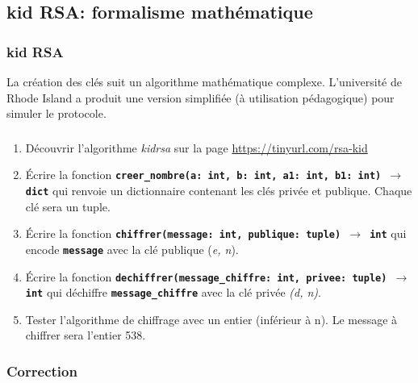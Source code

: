 \documentclass[svgnames,11pt]{beamer}
\begin{document}
\subsection{kid RSA: formalisme mathématique}
\begin{frame}
    \frametitle{kid RSA}

    La création des clés suit un algorithme mathématique complexe. L'université de Rhode Island a produit une version simplifiée (à utilisation pédagogique) pour simuler le protocole.

\end{frame}
\begin{frame}
    \frametitle{}

    \begin{activite}
        \begin{enumerate}
            \item Découvrir l'algorithme \emph{kidrsa} sur la page \url{https://tinyurl.com/rsa-kid}
            \item Écrire la fonction \textbf{\texttt{creer\_nombre(a: int, b: int, a1: int, b1: int) $\rightarrow$ dict}} qui renvoie un dictionnaire contenant les clés privée et publique. Chaque clé sera un tuple.
            \item Écrire la fonction \textbf{\texttt{chiffrer(message: int, publique: tuple) $\rightarrow$ int}} qui encode \texttt{\textbf{message}} avec la clé publique (\emph{e, n}).
            \item Écrire la fonction \textbf{\texttt{dechiffrer(message\_chiffre: int, privee: tuple) $\rightarrow$ int}} qui déchiffre \texttt{\textbf{message\_chiffre}} avec la clé privée \emph{(d, n)}.
            \item Tester l'algorithme de chiffrage avec un entier (inférieur à n). Le message à chiffrer sera l'entier 538.
        \end{enumerate}
        \end{activite}

\end{frame}
\begin{frame}
    \frametitle{Correction}

    \begin{center}
        
    \end{center}

\end{frame}
\end{document}
